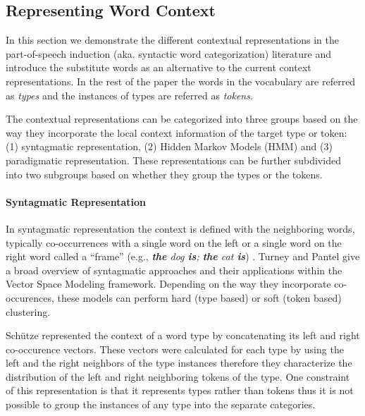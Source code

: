 \subsection{Representing Word Context}
\label{sec:representation}


In this section we demonstrate the different contextual
representations in the part-of-speech induction (aka. syntactic word
categorization) literature and introduce the substitute words as an
alternative to the current context representations.  In the rest of
the paper the words in the vocabulary are referred as {\em types} and
the instances of types are referred as {\em tokens}.

The contextual representations can be categorized into three groups
based on the way they incorporate the local context information of the
target type or token: (1) syntagmatic representation, (2) Hidden
Markov Models (HMM) and (3) paradigmatic representation.  These
representations can be further subdivided into two subgroups based on
whether they group the types or the tokens.

\paragraph{Syntagmatic Representation}

In syntagmatic representation the context is defined with the
neighboring words, typically co-occurrences with a single word on the
left or a single word on the right word called a ``frame'' (e.g., {\em
  {\bf the} dog {\bf is}; {\bf the} cat {\bf is}})
\cite{SchutzePe93,redington1998distributional,mintz2003frequent,20674613,lamar-EtAl:2010:Short,maron2010sphere}.
Turney and Pantel  give a
broad overview of syntagmatic approaches and their applications within
the Vector Space Modeling framework.  Depending on the way they
incorporate co-occurences, these models can perform hard (type based)
or soft (token based) clustering.

Sch\"{u}tze  represented the context of a word
type by concatenating its left and right co-occurence vectors.  These
vectors were calculated for each type by using the left and the right
neighbors of the type instances therefore they characterize the
distribution of the left and right neighboring tokens of the type.
One constraint of this representation is that it represents types
rather than tokens thus it is not possible to group the instances of
any type into the separate categories.

